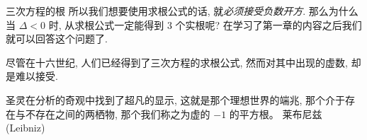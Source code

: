 \begin{frame}{三次方程的根}
	\onslide<+->
	所以我们想要使用求根公式的话, 就\emph{必须接受负数开方}.
	\onslide<+->
	那么为什么当 $\Delta<0$ 时, 从求根公式一定能得到 $3$ 个实根呢?
	\onslide<+->
	在学习了第一章的内容之后我们就可以回答这个问题了.

	\onslide<+->
	尽管在十六世纪, 人们已经得到了三次方程的求根公式, 然而对其中出现的虚数, 却是难以接受.
	
	\onslide<+->
	\begin{quote@*}
		圣灵在分析的奇观中找到了超凡的显示, 这就是那个理想世界的端兆, 那个介于存在与不存在之间的两栖物, 那个我们称之为虚的 $-1$ 的平方根。
	\tcblower
	莱布尼兹 (Leibniz)
	\end{quote@*}
\end{frame}
